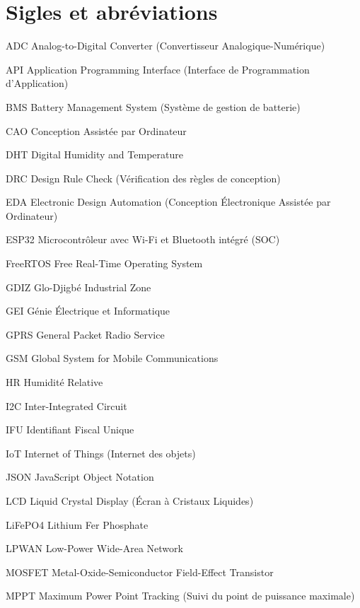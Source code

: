 \chapter*{Sigles et abréviations}

\begin{sigleslist}
    \item[ADC] Analog-to-Digital Converter (Convertisseur Analogique-Numérique)
    \item[API] Application Programming Interface (Interface de Programmation d'Application)
    \item[BMS] Battery Management System (Système de gestion de batterie)
    \item[CAO] Conception Assistée par Ordinateur
    \item[DHT] Digital Humidity and Temperature
    \item[DRC] Design Rule Check (Vérification des règles de conception)
    \item[EDA] Electronic Design Automation (Conception Électronique Assistée par Ordinateur)
    \item[ESP32] Microcontrôleur avec Wi-Fi et Bluetooth intégré (SOC)
    \item[FreeRTOS] Free Real-Time Operating System
    \item[GDIZ] Glo-Djigbé Industrial Zone
    \item[GEI] Génie Électrique et Informatique
    \item[GPRS] General Packet Radio Service
    \item[GSM] Global System for Mobile Communications
    \item[HR] Humidité Relative
    \item[I2C] Inter-Integrated Circuit
    \item[IFU] Identifiant Fiscal Unique
    \item[IoT] Internet of Things (Internet des objets)
    \item[JSON] JavaScript Object Notation
    \item[LCD] Liquid Crystal Display (Écran à Cristaux Liquides)
    \item[LiFePO4] Lithium Fer Phosphate
    \item[LPWAN] Low-Power Wide-Area Network
    \item[MOSFET] Metal-Oxide-Semiconductor Field-Effect Transistor
    \item[MPPT] Maximum Power Point Tracking (Suivi du point de puissance maximale)

\end{sigleslist}
